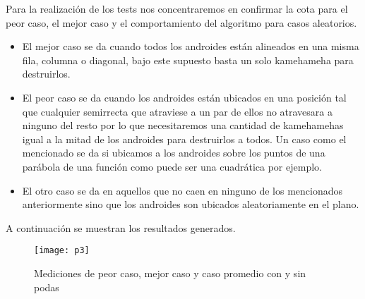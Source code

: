 Para la realización de los tests nos concentraremos en confirmar la cota para el peor caso, el mejor caso y el comportamiento del algoritmo para casos aleatorios.

\begin{itemize}
\item El mejor caso se da cuando todos los androides están alineados en una misma fila, columna o diagonal, bajo este supuesto basta un solo kamehameha para destruirlos.
\item El peor caso se da cuando los androides están ubicados en una posición tal que cualquier semirrecta que atraviese a un par de ellos no atravesara a ninguno del resto por lo que necesitaremos una cantidad de kamehamehas igual a la mitad de los androides para destruirlos a todos. Un caso como el mencionado se da si ubicamos a los androides sobre los puntos de una parábola de una función como puede ser una cuadrática por ejemplo.
\item El otro caso se da en aquellos que no caen en ninguno de los mencionados anteriormente sino que los androides son ubicados aleatoriamente en el plano.
\end{itemize}

A continuación se muestran los resultados generados.

\begin{figure}[h!]
\begin{center}
\texttt{[image: p3]}
\caption{Mediciones de peor caso, mejor caso y caso promedio con y sin podas}
\end{center}
\end{figure}